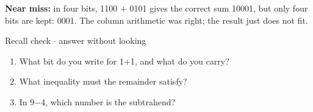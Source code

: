 \documentclass[11pt]{article}
\begin{document}
\begin{keepsection}
\begin{keepsection}
\begin{notebox}\textbf{Near miss:} in four bits, 1100 + 0101 gives the correct sum 10001, but only four bits are kept: 0001. The column arithmetic was right; the result just does not fit.\end{notebox}

\begin{recallbox}{Recall check \ensuremath{\cdot} answer without looking}
\begin{enumerate}
\item What bit do you write for 1+1, and what do you carry?
\item What inequality must the remainder satisfy?
\item In 9\ensuremath{-}4, which number is the subtrahend?
\end{enumerate}

\end{recallbox}
\end{keepsection}
\end{keepsection}
\end{document}
